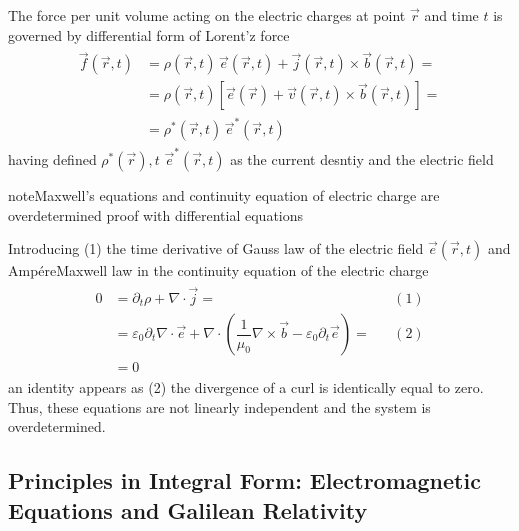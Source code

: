 \documentclass[letterpaper,10pt,english]{jupyterBook}
\begin{document}
\sphinxAtStartPar
{} The force per unit volume acting on the electric charges at point \(\vec{r}\) and time \(t\) is governed by differential form of Lorent’z force
\begin{equation*}
\begin{split}\begin{aligned}
  \vec{f}(\vec{r},t) & = \rho(\vec{r},t) \, \vec{e}(\vec{r},t) + \vec{j}(\vec{r},t) \times \vec{b}(\vec{r},t) = \\
                           & = \rho(\vec{r},t) \left[ \vec{e}(\vec{r}) + \vec{v}(\vec{r},t) \times \vec{b}(\vec{r},t) \right] =  \\
                           & = \rho^*(\vec{r},t) \, \vec{e}^*(\vec{r},t) 
\end{aligned}\end{split}
\end{equation*}
\sphinxAtStartPar
having defined \(\rho^*{(\vec{r}), t}\) \(\vec{e}^*(\vec{r}, t)\) as the current desntiy and the electric field 

\begin{sphinxadmonition}{note}{Maxwell’s equations and continuity equation of electric charge are overdetermined \sphinxhyphen{} proof with differential equations}

\sphinxAtStartPar
Introducing (1) the time derivative of Gauss law of the electric field \(\vec{e}(\vec{r},t)\) and Ampére\sphinxhyphen{}Maxwell law in the continuity equation of the electric charge
\begin{equation*}
\begin{split}\begin{aligned}
  0 & = \partial_t \rho + \nabla \cdot \vec{j} = && (1) \\
    & = \varepsilon_0 \partial_t \nabla \cdot \vec{e} + \nabla \cdot \left(\dfrac{1}{\mu_0}\nabla \times \vec{b} - \varepsilon_0 \partial_t \vec{e} \right) = && (2) \\
    & = 0
\end{aligned}\end{split}
\end{equation*}
\sphinxAtStartPar
an identity appears as (2) the divergence of a curl is identically equal to zero. Thus, these equations are not linearly independent and the system is over\sphinxhyphen{}determined.
\end{sphinxadmonition}


\subsection{Principles in Integral Form: Electromagnetic Equations and Galilean Relativity}
\label{\detokenize{ch/principles-vacuum:principles-in-integral-form-electromagnetic-equations-and-galilean-relativity}}\label{\detokenize{ch/principles-vacuum:classical-electromagnetism-principles-integral}}
\end{document}
